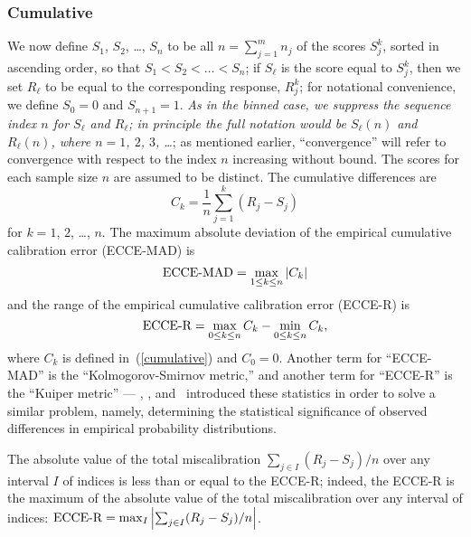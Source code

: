 \documentclass{article}
\begin{document}
\subsubsection{Cumulative}
\label{cumsub}

We now define $S_1$, $S_2$, \dots, $S_n$ to be all $n = \sum_{j=1}^m n_j$
of the scores $S_j^k$, sorted in ascending order, so that
$S_1 < S_2 < \dots < S_n$; if $S_\ell$ is the score equal to $S_j^k$,
then we set $R_\ell$ to be equal to the corresponding response, $R_j^k$;
for notational convenience, we define $S_0 = 0$ and $S_{n+1} = 1$.
{\it As in the binned case, we suppress the sequence index $n$
for $S_\ell$ and $R_\ell$; in principle the full notation would be
$S_\ell(n)$ and $R_\ell(n)$, where $n = 1$, $2$, $3$, \dots};
as mentioned earlier, ``convergence'' will refer to convergence
with respect to the index $n$ increasing without bound. 
The scores for each sample size $n$ are assumed to be distinct.
The cumulative differences are
%
\begin{equation}
\label{cumulative}
C_k = \frac{1}{n} \sum_{j=1}^k (R_j - S_j)
\end{equation}
%
for $k = 1$, $2$, \dots, $n$.
The maximum absolute deviation of the empirical cumulative calibration error
(ECCE-MAD) is
%
\begin{equation}
\label{ks}
\hbox{ECCE-MAD} = \max_{1 \le k \le n} |C_k|
\end{equation}
%
and the range of the empirical cumulative calibration error (ECCE-R) is
%
\begin{equation}
\label{ku}
\hbox{ECCE-R} = \max_{0 \le k \le n} C_k - \min_{0 \le k \le n} C_k,
\end{equation}
%
where $C_k$ is defined in~(\ref{cumulative}) and $C_0 = 0$.
Another term for ``ECCE-MAD'' is the ``Kolmogorov-Smirnov metric,''
and another term for ``ECCE-R'' is the ``Kuiper metric'' ---
\cite{Kolmogorov}, \cite{Smirnov}, and~\cite{Kuiper} introduced
these statistics in order to solve a similar problem, namely,
determining the statistical significance of observed differences
in empirical probability distributions.

The absolute value of the total miscalibration
$\sum_{j \in I} (R_j - S_j)/n$
over any interval $I$ of indices is less than or equal to the ECCE-R;
indeed, the ECCE-R is the maximum of the absolute value
of the total miscalibration over any interval of indices:
$\hbox{ECCE-R} = \max_I \left| \sum_{j \in I} (R_j - S_j)/n \right|$.
\end{document}
